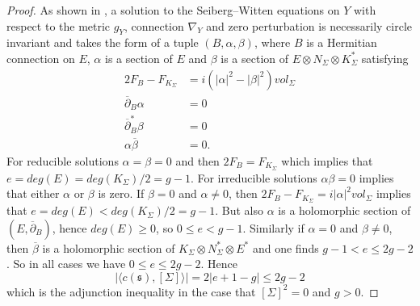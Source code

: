 \documentclass{amsart}
\theoremstyle{definition}
\theoremstyle{remark}
\numberwithin{equation}{section}
\begin{document}
\begin{proof}
As shown in \cite[]{moy}, a solution to the Seiberg--Witten equations on $Y$ with respect to the metric $g_Y$, connection $\nabla_Y$ and zero perturbation is necessarily circle invariant and takes the form of a tuple $(B , \alpha , \beta)$, where $B$ is a Hermitian connection on $E$, $\alpha$ is a section of $E$ and $\beta$ is a section of $E \otimes N_\Sigma \otimes K_\Sigma^{*}$ satisfying
\begin{align*}
2F_B - F_{K_\Sigma} &= i( |\alpha|^2 - |\beta|^2 ) vol_\Sigma \\
\overline{\partial}_B \alpha &= 0 \\
\overline{\partial}_B^* \beta &= 0 \\
\alpha \overline{\beta} &= 0.
\end{align*}
For reducible solutions $\alpha = \beta = 0$ and then $2F_B = F_{K_\Sigma}$ which implies that $e = deg(E) = deg(K_\Sigma)/2 = g-1$. For irreducible solutions $\alpha \beta = 0$ implies that either $\alpha$ or $\beta$ is zero. If $\beta = 0$ and $\alpha \neq 0$, then $2F_B - F_{K_\Sigma} = i |\alpha|^2 vol_\Sigma$ implies that $e = deg(E) < deg(K_\Sigma)/2 = g-1$. But also $\alpha$ is a holomorphic section of $(E , \overline{\partial}_B)$, hence $deg(E) \ge 0$, so $0 \le e < g-1$. Similarly if $\alpha = 0$ and $\beta \neq 0$, then $\overline{\beta}$ is a holomorphic section of $K_\Sigma \otimes N_\Sigma^* \otimes E^*$ and one finds $g-1 < e \le 2g-2$. So in all cases we have $0 \le e \le 2g-2$. Hence
\[
| \langle c(\mathfrak{s}) , [\Sigma] \rangle | = 2| e +1-g | \le 2g-2
\]
which is the adjunction inequality in the case that $[\Sigma]^2 = 0$ and $g>0$.


\end{proof}
\end{document}
